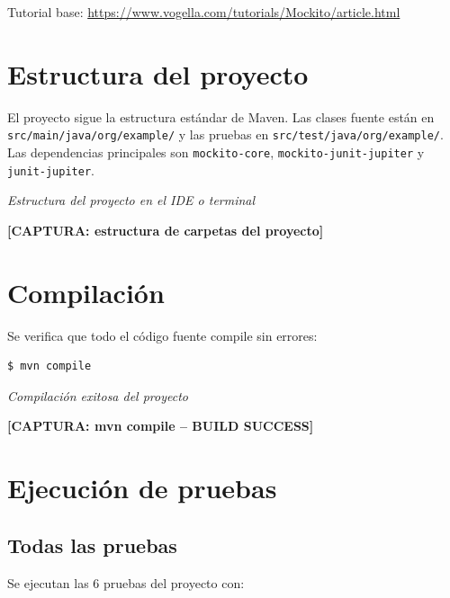 \documentclass{article}
\begin{document}
Tutorial base: \url{https://www.vogella.com/tutorials/Mockito/article.html}

\section{Estructura del proyecto}

El proyecto sigue la estructura est\'andar de Maven. Las clases fuente est\'an en \texttt{src/main/java/org/example/} y las pruebas en \texttt{src/test/java/org/example/}. Las dependencias principales son \texttt{mockito-core}, \texttt{mockito-junit-jupiter} y \texttt{junit-jupiter}.

\begin{center}
    \textit{Estructura del proyecto en el IDE o terminal}

    \textbf{[CAPTURA: estructura de carpetas del proyecto]}
\end{center}

\section{Compilaci\'on}

Se verifica que todo el c\'odigo fuente compile sin errores:

\begin{verbatim}
$ mvn compile
\end{verbatim}

\begin{center}
    \textit{Compilaci\'on exitosa del proyecto}

    \textbf{[CAPTURA: mvn compile -- BUILD SUCCESS]}
\end{center}

\section{Ejecuci\'on de pruebas}

\subsection{Todas las pruebas}

Se ejecutan las 6 pruebas del proyecto con:
\end{document}
